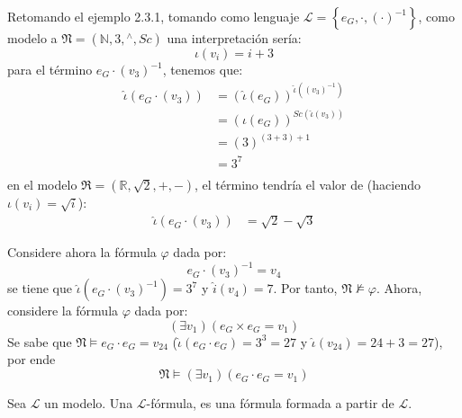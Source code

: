 \documentclass[12pt]{report}
\newcounter{it}
\theoremstyle{largebreak}
\begin{document}
    \begin{exa}
        Retomando el ejemplo 2.3.1, tomando como lenguaje $\mathcal{L}=\left\{e_G,\cdot,(\cdot)^{-1} \right\}$, como modelo a $\mathfrak{N}=(\mathbb{N},3,{}^{\wedge},Sc)$ una interpretación sería:
        \begin{equation*}
            \iota(v_i)=i+3
        \end{equation*}
        para el término $e_G\cdot(v_3)^{-1}$, tenemos que:
        \begin{equation*}
            \begin{split}
                \hat{\iota}(e_G\cdot(v_3))&=(\hat{\iota}(e_G))^{\hat{\iota}((v_3)^{-1})}\\
                &=(\iota(e_G))^{Sc(\hat{\iota}(v_3))}\\
                &=(3)^{(3+3)+1}\\
                &=3^7\\
            \end{split}
        \end{equation*}
        en el modelo $\mathfrak{R}=(\mathbb{R},\sqrt{2},+,-)$, el término tendría el valor de (haciendo $\iota(v_i)=\sqrt{i}$):
        \begin{equation*}
            \begin{split}
                \hat{\iota}(e_G\cdot(v_3))&=\sqrt{2}-\sqrt{3}
            \end{split}
        \end{equation*}

        Considere ahora la fórmula $\varphi$ dada por:
        \begin{equation*}
            e_G\cdot(v_3)^{-1}=v_4
        \end{equation*}
        se tiene que $\hat{\iota}(e_G\cdot(v_3)^{-1})=3^7$ y $\hat{i}(v_4)=7$. Por tanto, $\mathfrak{N}\nvDash\varphi$. Ahora, considere la fórmula $\varphi$ dada por:
        \begin{equation*}
            (\exists v_1)(e_G\times e_G=v_1 )
        \end{equation*}
        Se sabe que $\mathfrak{N}\vDash e_G\cdot e_G=v_{24}$ ($\hat{\iota}(e_G\cdot e_G)=3^3=27$ y $\hat{\iota}(v_{24})=24+3=27$), por ende
        \begin{equation*}
            \mathfrak{N}\vDash (\exists v_1)(e_G\cdot e_G=v_{1})
        \end{equation*}
    \end{exa}

    \begin{mydef}
        Sea $\mathcal{L}$ un modelo. Una $\mathcal{L}$-fórmula, es una fórmula formada a partir de $\mathcal{L}$.
    \end{mydef}
\end{document}
